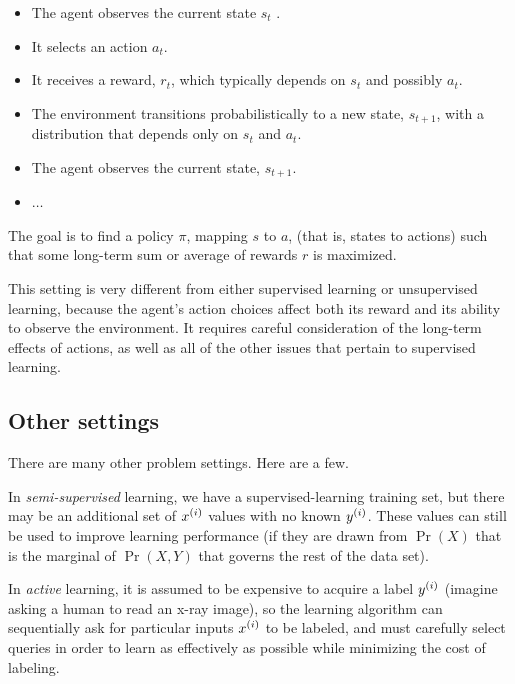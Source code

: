 \begin{itemize}

  \item The agent observes the current state ${s}_t$ .

  \item It selects an action ${a}_t.$
  \item It receives a reward, ${r}_{t}$, which typically depends on ${s}_{t}$
        and possibly ${a}_{t}$.
  \item The environment transitions probabilistically to a new state,
        ${s}_{t+1}$, with a distribution that depends only on ${s}_{t}$
        and ${a}_{t}$.
  \item The agent observes the current state, ${s}_{t+1}$.
  \item $\ldots$
\end{itemize}
The goal is to find a policy $\pi$, mapping $s$ to $a$, (that is,
states to actions) such that some long-term sum or average of rewards
$r$ is maximized.

This setting is very different from either supervised learning or
unsupervised learning, because the agent's action choices affect both
its reward and its ability to observe the environment.
It requires careful consideration of the long-term effects of actions,
as well as all of the other issues that pertain to supervised
learning.



\subsection{Other settings}
There are many other problem settings.  Here are a few.

In {\em semi-supervised} learning, we have a supervised-learning training set, but there may be an additional set of
$x^{(i)}$ values with no known $y^{(i)}$.  These values can still
be used to improve learning performance (if they are drawn from
$\Pr(X)$ that is the marginal of $\Pr(X, Y)$ that governs the rest of
the data set).

In {\em active} learning, it is assumed to be expensive to acquire a
label $y^{(i)}$ (imagine asking a human to read an x-ray image), so
the learning algorithm can sequentially ask for particular inputs
$x^{(i)}$ to be labeled, and must carefully select queries in order
to learn as effectively as possible while minimizing the cost of
labeling.

